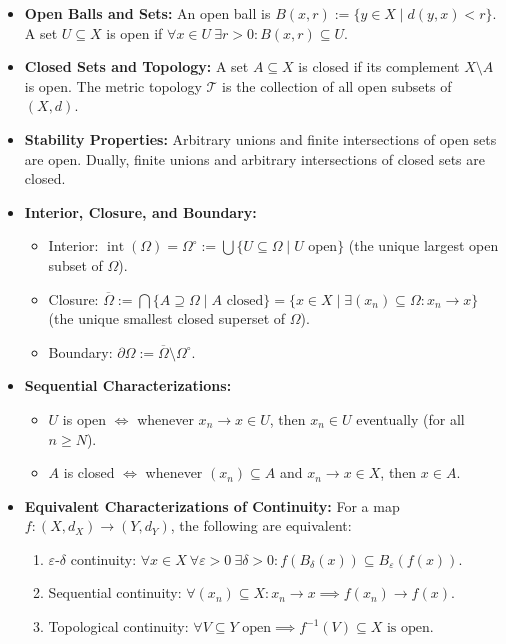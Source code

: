 \begin{overview}
\begin{itemize}
    \item \textbf{Open Balls and Sets:} An open ball is $B(x, r) := \{y \in X \mid d(y, x) < r\}$. A set $U \subseteq X$ is open if $\forall x \in U \ \exists r > 0 \colon B(x, r) \subseteq U$.
    \item \textbf{Closed Sets and Topology:} A set $A \subseteq X$ is closed if its complement $X \setminus A$ is open. The metric topology $\mathcal{T}$ is the collection of all open subsets of $(X, d)$.
    \item \textbf{Stability Properties:} Arbitrary unions and finite intersections of open sets are open. Dually, finite unions and arbitrary intersections of closed sets are closed.
    \item \textbf{Interior, Closure, and Boundary:}
    \begin{itemize}
        \item Interior: $\operatorname{int}(\Omega) = \Omega^\circ := \bigcup \{U \subseteq \Omega \mid U \text{ open}\}$ (the unique largest open subset of $\Omega$).
        \item Closure: $\overline{\Omega} := \bigcap \{A \supseteq \Omega \mid A \text{ closed}\} = \{x \in X \mid \exists (x_n) \subseteq \Omega \colon x_n \to x\}$ (the unique smallest closed superset of $\Omega$).
        \item Boundary: $\partial\Omega := \overline{\Omega} \setminus \Omega^\circ$.
    \end{itemize}
    \item \textbf{Sequential Characterizations:}
    \begin{itemize}
        \item $U$ is open $\iff$ whenever $x_n \to x \in U$, then $x_n \in U$ eventually (for all $n \ge N$).
        \item $A$ is closed $\iff$ whenever $(x_n) \subseteq A$ and $x_n \to x \in X$, then $x \in A$.
    \end{itemize}
    \item \textbf{Equivalent Characterizations of Continuity:} For a map $f \colon (X, d_X) \to (Y, d_Y)$, the following are equivalent:
    \begin{enumerate}[label=\textbf{(\arabic*)}]
        \item $\varepsilon$-$\delta$ continuity: $\forall x \in X \ \forall \varepsilon > 0 \ \exists \delta > 0 \colon f(B_\delta(x)) \subseteq B_\varepsilon(f(x))$.
        \item Sequential continuity: $\forall (x_n) \subseteq X \colon x_n \to x \implies f(x_n) \to f(x)$.
        \item Topological continuity: $\forall V \subseteq Y \text{ open} \implies f^{-1}(V) \subseteq X \text{ is open}$.
    \end{enumerate}
\end{itemize}
\end{overview}